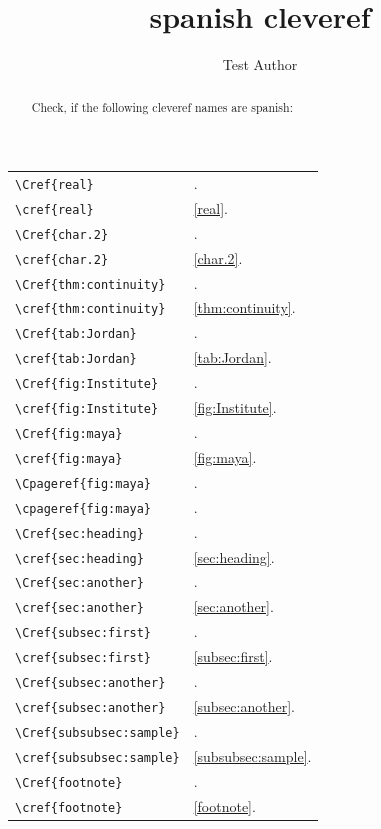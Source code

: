 \documentclass{snapshotmfo}
\author{Test Author}
\title{spanish cleveref}
\begin{document}

\begin{abstract}
Check, if the following cleveref names are spanish:
\end{abstract}

\noindent\begin{longtable}{@{}l@{\quad yields\quad}l@{}}
	\verb+\Cref{real}+             &\Cref{real}.\\
	\verb+\cref{real}+             &\cref{real}.\\[1ex]
	\verb+\Cref{char.2}+           &\Cref{char.2}.\\
	\verb+\cref{char.2}+           &\cref{char.2}.\\[1ex]
	\verb+\Cref{thm:continuity}+   &\Cref{thm:continuity}.\\
	\verb+\cref{thm:continuity}+   &\cref{thm:continuity}.\\[1ex]
	\verb+\Cref{tab:Jordan}+       &\Cref{tab:Jordan}.\\
	\verb+\cref{tab:Jordan}+       &\cref{tab:Jordan}.\\[1ex]
	\verb+\Cref{fig:Institute}+    &\Cref{fig:Institute}.\\
	\verb+\cref{fig:Institute}+    &\cref{fig:Institute}.\\[1ex]
	\verb+\Cref{fig:maya}+         &\Cref{fig:maya}.\\
	\verb+\cref{fig:maya}+         &\cref{fig:maya}.\\[1ex]
	\verb+\Cpageref{fig:maya}+     &\Cpageref{fig:maya}.\\
	\verb+\cpageref{fig:maya}+     &\cpageref{fig:maya}.\\[1ex]
	\verb+\Cref{sec:heading}+      &\Cref{sec:heading}.\\
	\verb+\cref{sec:heading}+      &\cref{sec:heading}.\\[1ex]
	\verb+\Cref{sec:another}+      &\Cref{sec:another}.\\
	\verb+\cref{sec:another}+      &\cref{sec:another}.\\[1ex]
	\verb+\Cref{subsec:first}+     &\Cref{subsec:first}.\\
	\verb+\cref{subsec:first}+     &\cref{subsec:first}.\\[1ex]
	\pagebreak
	\verb+\Cref{subsec:another}+   &\Cref{subsec:another}.\\
	\verb+\cref{subsec:another}+   &\cref{subsec:another}.\\[1ex]
	\verb+\Cref{subsubsec:sample}+ &\Cref{subsubsec:sample}.\\
	\verb+\cref{subsubsec:sample}+ &\cref{subsubsec:sample}.\\[1ex]
	\verb+\Cref{footnote}+         &\Cref{footnote}.\\
	\verb+\cref{footnote}+         &\cref{footnote}.\\
\end{longtable}
\end{document}
